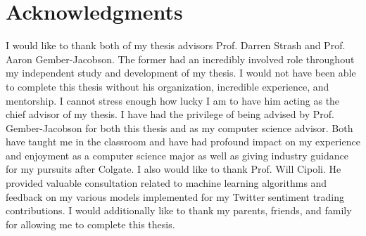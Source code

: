 \documentclass[../thesis.tex]{subfiles}
\begin{document}
\chapter*{Acknowledgments}

I would like to thank both of my thesis advisors Prof. Darren Strash and Prof. Aaron Gember-Jacobson. The former had an incredibly involved role throughout my independent study and development of my thesis. I would not have been able to complete this thesis without his organization, incredible experience, and mentorship. I cannot stress enough how lucky I am to have him acting as the chief advisor of my thesis. I have had the privilege of being advised by Prof. Gember-Jacobson for both this thesis and as my computer science advisor. Both have taught me in the classroom and have had profound impact on my experience and enjoyment as a computer science major as well as giving industry guidance for my pursuits after Colgate. I also would like to thank Prof. Will Cipoli. He provided valuable consultation related to machine learning algorithms and feedback on my various models implemented for my Twitter sentiment trading contributions. I would additionally like to thank my parents, friends, and family for allowing me to complete this thesis. 

\cleardoublepage
\end{document}
